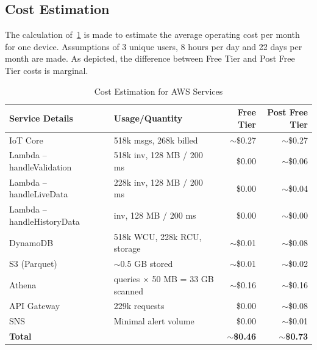 \documentclass[conference,a4paper,flushend]{cs-techrep} %
\begin{document}
\subsection{Cost Estimation}\label{sec:cost_estimation}

The calculation of~\cref{tab:aws-costs} is made to estimate the average operating cost per month for one device. 
Assumptions of 3 unique users, 8 hours per day and 22 days per month are made. 
As depicted, the difference between Free Tier and Post Free Tier costs is marginal.

\begin{table}[!htb]
    \centering
    \caption{Cost Estimation for AWS Services}
    \label{tab:aws-costs}
    \begin{tabularx}{0.8\textwidth}{>{\raggedright\arraybackslash}l >{\raggedright\arraybackslash}l >{\raggedright\arraybackslash}r >{\raggedright\arraybackslash}r}
        \toprule
        \textbf{Service Details} & \textbf{Usage/Quantity} & \textbf{Free Tier} & \textbf{Post Free Tier} \\
        \midrule
        IoT Core~\cite{awsIotCore} & 518k msgs, 268k billed & \(\sim\)\$0.27 & \(\sim\)\$0.27 \\ 
        Lambda – handleValidation~\cite{aws-lambda} & 518k inv, 128 MB / 200 ms & \$0.00 & \(\sim\)\$0.06 \\ 
        Lambda – handleLiveData~\cite{aws-lambda} & 228k inv, 128 MB / 200 ms & \$0.00 & \(\sim\)\$0.04 \\ 
        Lambda – handleHistoryData~\cite{aws-lambda} & 660 inv, 128 MB / 200 ms & \$0.00 & \(\sim\)\$0.00 \\ 
        DynamoDB~\cite{aws-dynamodb} & 518k WCU, 228k RCU, storage & \(\sim\)\$0.01 & \(\sim\)\$0.08 \\ 
        S3 (Parquet)~\cite{aws-s3} & \(\sim\)0.5 GB stored & \(\sim\)\$0.01 & \(\sim\)\$0.02 \\ 
        Athena~\cite{aws-athena} & 660 queries \(\times\) 50 MB = 33 GB scanned & \(\sim\)\$0.16 & \(\sim\)\$0.16 \\ 
        API Gateway~\cite{aws-api-gateway} & 229k requests & \$0.00 & \(\sim\)\$0.08 \\ 
        SNS~\cite{aws-sns} & Minimal alert volume & \$0.00 & \(\sim\)\$0.01 \\ 
        \midrule
        \textbf{Total} & & \textbf{\(\sim\)\$0.46} & \textbf{\(\sim\)\$0.73} \\ 
        \bottomrule
    \end{tabularx}
\end{table}
\end{document}

